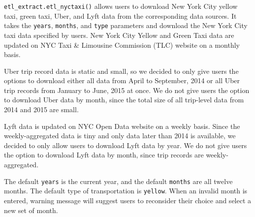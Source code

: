 \documentclass[12pt,twoside]{reedthesis}
\newenvironment{Shaded}{\begin{snugshade}}{\end{snugshade}}
\newcommand{\KeywordTok}[1]{\textcolor[rgb]{0.13,0.29,0.53}{\textbf{#1}}}
\newcommand{\DataTypeTok}[1]{\textcolor[rgb]{0.13,0.29,0.53}{#1}}
\newcommand{\DecValTok}[1]{\textcolor[rgb]{0.00,0.00,0.81}{#1}}
\newcommand{\StringTok}[1]{\textcolor[rgb]{0.31,0.60,0.02}{#1}}
\newcommand{\OperatorTok}[1]{\textcolor[rgb]{0.81,0.36,0.00}{\textbf{#1}}}
\newcommand{\NormalTok}[1]{#1}
\theoremstyle{definition}
\theoremstyle{definition}
\theoremstyle{definition}
\theoremstyle{remark}
\begin{document}
\texttt{etl\_extract.etl\_nyctaxi()} allows users to download New York
City yellow taxi, green taxi, Uber, and Lyft data from the corresponding
data sources. It takes the \texttt{years}, \texttt{months}, and
\texttt{type} parameters and download the New York City taxi data
specified by users. New York City Yellow and Green Taxi data are updated
on NYC Taxi \& Limousine Commission (TLC) website on a monthly basis.
\begin{Shaded}
\end{Shaded}
Uber trip record data is static and small, so we decided to only give
users the options to download either all data from April to September,
2014 or all Uber trip records from January to June, 2015 at once. We do
not give users the option to download Uber data by month, since the
total size of all trip-level data from 2014 and 2015 are small.
\begin{Shaded}
\end{Shaded}
Lyft data is updated on NYC Open Data website on a weekly basis. Since
the weekly-aggregated data is tiny and only data later than 2014 is
available, we decided to only allow users to download Lyft data by year.
We do not give users the option to download Lyft data by month, since
trip records are weekly-aggregated.
\begin{Shaded}
\end{Shaded}
The default \texttt{years} is the current year, and the default
\texttt{months} are all twelve months. The default type of
transportation is \texttt{yellow}. When an invalid month is entered,
warning message will suggest users to reconsider their choice and select
a new set of month.
\end{document}
